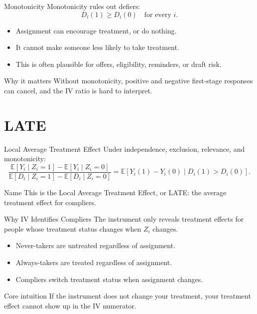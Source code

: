 \documentclass[11pt,aspectratio=169]{beamer}
\newcommand{\E}{\mathbb{E}}
\newcommand{\derivbutton}[1]{\vspace{0.4em}\hfill\hyperlink{app:#1}{\beamerbutton{Appendix details}}}
\begin{document}
\begin{frame}{Monotonicity}
  \hypertarget{main:monotonicity}{}
  Monotonicity rules out defiers:
  \[
    D_i(1)\geq D_i(0)
    \quad \text{for every } i.
  \]

  \begin{itemize}
    \item Assignment can encourage treatment, or do nothing.
    \item It cannot make someone less likely to take treatment.
    \item This is often plausible for offers, eligibility, reminders, or draft risk.
  \end{itemize}

  \begin{block}{Why it matters}
    Without monotonicity, positive and negative first-stage responses can cancel, and the IV ratio is hard to interpret.
  \end{block}
\end{frame}

\section{LATE}

\begin{frame}{Local Average Treatment Effect}
  \hypertarget{main:late}{}
  Under independence, exclusion, relevance, and monotonicity:
  \[
    \frac{\E[Y_i\mid Z_i=1]-\E[Y_i\mid Z_i=0]}
         {\E[D_i\mid Z_i=1]-\E[D_i\mid Z_i=0]}
    =
    \E[Y_i(1)-Y_i(0)\mid D_i(1)>D_i(0)].
  \]

  \begin{block}{Name}
    This is the Local Average Treatment Effect, or LATE: the average treatment effect for compliers.
  \end{block}

  \derivbutton{late-proof}
\end{frame}

\begin{frame}{Why IV Identifies Compliers}
  The instrument only reveals treatment effects for people whose treatment status changes when \(Z_i\) changes.

  \begin{itemize}
    \item Never-takers are untreated regardless of assignment.
    \item Always-takers are treated regardless of assignment.
    \item Compliers switch treatment status when assignment changes.
  \end{itemize}

  \begin{block}{Core intuition}
    If the instrument does not change your treatment, your treatment effect cannot show up in the IV numerator.
  \end{block}
\end{frame}
\end{document}
